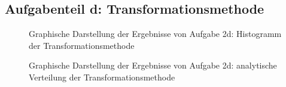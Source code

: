 \subsection*{Aufgabenteil d: Transformationsmethode}
\begin{landscape}
	\begin{figure}
		\caption{Graphische Darstellung der Ergebnisse von Aufgabe 2d: Histogramm der Transformationsmethode}
		\label{fig:2d}
	\end{figure}
\end{landscape}

\begin{landscape}
	\begin{figure}
		\caption{Graphische Darstellung der Ergebnisse von Aufgabe 2d: analytische Verteilung der Transformationsmethode}
		\label{fig:2d_v}
	\end{figure}
\end{landscape}



